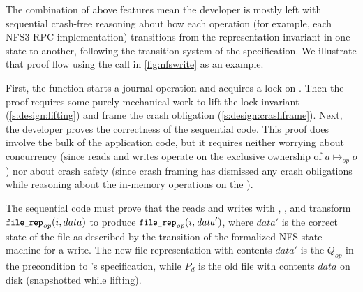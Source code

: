 The combination of above features mean the developer is mostly left with
sequential crash-free reasoning about how each operation (for example, each NFS3 RPC
implementation) transitions from the representation invariant in one state to
another, following the transition system of the specification. We
illustrate that proof flow using the  call in
\autoref{fig:nfswrite} as an example.



First, the function starts a journal operation and acquires a lock on . Then the proof
requires some purely mechanical work to lift the lock invariant
(\autoref{s:design:lifting}) and frame the crash obligation
(\autoref{s:design:crashframe}). Next, the developer proves the correctness of
the sequential code. This proof does involve the bulk of the application code,
but it requires neither worrying about concurrency (since reads and writes
operate on the exclusive ownership of $a \mapsto_{\mathit{op}} o$) nor about crash safety
(since crash framing has dismissed any crash obligations while reasoning
about the in-memory operations on the ).

The sequential code must prove that the reads and writes with ,
, and  transform $\cc{file_rep}_{\mathit{op}}(i, data)$ to
produce $\cc{file_rep}_{\mathit{op}}(i, \mathit{data}')$, where $data'$ is the correct state of
the file as described by the transition of the formalized NFS state machine for a write. The new
file representation with contents $data'$ is the $Q_{\mathit{op}}$ in the precondition
to 's specification, while $P_{d}$ is the old file with contents
$\mathit{data}$ on disk (snapshotted while lifting).

